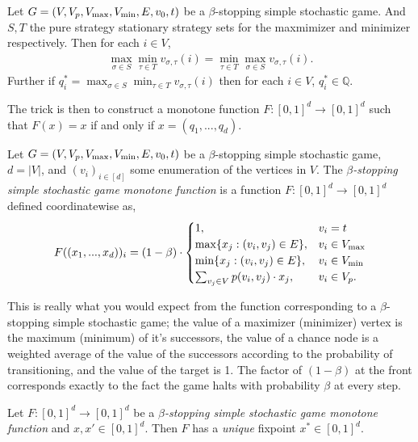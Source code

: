 \begin{theorem} \label{ssgHasValue}
  Let $G = (V, V_p, V_{\max}, V_{\min}, E, v_0, t)$ be a $\beta$-stopping simple 
  stochastic game. And $S, T$ the pure strategy stationary strategy sets
  for the maxmimizer and minimizer respectively.
  Then for each $i \in V$,
  \begin{align*}
    \max_{\sigma \in S} \min_{\tau \in T} v_{\sigma, \tau} (i) = 
  \min_{\tau \in T} \max_{\sigma \in S} v_{\sigma, \tau} (i).
  \end{align*}
  Further if $q_i^* = \max_{\sigma \in S} \min_{\tau \in T} v_{\sigma, \tau} (i)$
  then for each $i \in V$, $q_i^* \in \mathbb{Q}$.
\end{theorem}
The trick is then to construct a monotone function $F : [0, 1]^d \to [0, 1]^d$
such that $F(x) = x$ if and only if $x = (q_1, ..., q_d)$.
\begin{definition}
  Let $G = (V, V_p, V_{\max}, V_{\min}, E, v_0, t)$ be a $\beta$-stopping simple stochastic game, 
  $d = |V|$, and $(v_i)_{i \in [d]}$ some enumeration of the vertices in $V$. 
  The \emph{$\beta$-stopping simple stochastic game monotone function} is a function
  $F : [0, 1]^d \to [0, 1]^d$ defined coordinatewise as,
  \begin{align*}
    F((x_1, ..., x_d))_i = 
      \left( 1 - \beta \right) \cdot
      \begin{cases}
        1, & v_i = t \\
        \max\{x_j : (v_i, v_j) \in E\}, & v_i \in V_{\max} \\
        \min\{x_j : (v_i, v_j) \in E\}, & v_i \in V_{\min} \\
        \sum_{v_j \in V} p(v_i, v_j) \cdot x_j, & v_i \in V_p.
      \end{cases}
  \end{align*}
\end{definition}
This is really what you would expect from the function corresponding to a $\beta$-stopping
simple stochastic game; the value of a maximizer (minimizer) vertex is the maximum (minimum)
of it's successors, the value of a chance node is a weighted average of the value of the successors
according to the probability of transitioning, and the value of the target is 1. The factor
of $(1 - \beta)$ at the front corresponds exactly to the fact the game halts with probability $\beta$
at every step.
\begin{lemma}\label{ssgUnique}
  Let $F : [0, 1]^d \to [0, 1]^d$ be a \emph{$\beta$-stopping simple stochastic game monotone function} and $x, x' \in [0, 1]^d$.
  Then $F$ has a \emph{unique} fixpoint $x^* \in [0, 1]^d$.
\end{lemma}

